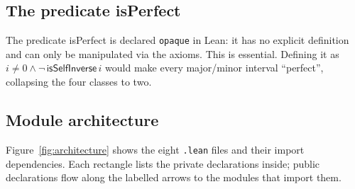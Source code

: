 \documentclass{amsart}
\begin{document}
\subsection*{The predicate \texorpdfstring{\textsf{isPerfect}}{isPerfect}}

The predicate \textsf{isPerfect} is declared \texttt{opaque} in Lean: it
has no explicit definition and can only be manipulated via the axioms.
This is essential.  Defining it as $i \neq 0 \wedge \neg\,\textsf{isSelfInverse}\,i$
would make every major/minor interval ``perfect'', collapsing the four
classes to two.



\subsection*{Module architecture}

Figure~\ref{fig:architecture} shows the eight \texttt{.lean} files and
their import dependencies.  Each rectangle lists the private declarations
inside; public declarations flow along the labelled arrows to the modules
that import them.
\end{document}
